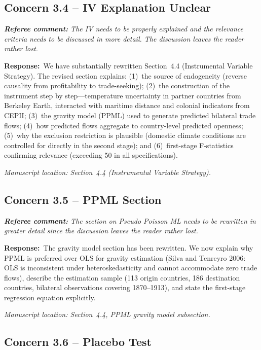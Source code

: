 \documentclass[11pt]{article}
\newcommand{\RC}[1]{\begin{refereebox}\textit{\textbf{Referee comment:} #1}\end{refereebox}}
\newcommand{\AR}{\noindent\textbf{Response:}\ }
\begin{document}
\subsection*{Concern 3.4 -- IV Explanation Unclear}

\RC{The IV needs to be properly explained and the relevance criteria needs to be discussed in more detail. The discussion leaves the reader rather lost.}

\AR We have substantially rewritten Section~4.4 (Instrumental Variable Strategy). The revised section explains: (1)~the source of endogeneity (reverse causality from profitability to trade-seeking); (2)~the construction of the instrument step by step---temperature uncertainty in partner countries from Berkeley Earth, interacted with maritime distance and colonial indicators from CEPII; (3)~the gravity model (PPML) used to generate predicted bilateral trade flows; (4)~how predicted flows aggregate to country-level predicted openness; (5)~why the exclusion restriction is plausible (domestic climate conditions are controlled for directly in the second stage); and (6)~first-stage F-statistics confirming relevance (exceeding 50 in all specifications).

\smallskip\noindent\textit{Manuscript location: Section~4.4 (Instrumental Variable Strategy).}

\subsection*{Concern 3.5 -- PPML Section}

\RC{The section on Pseudo Poisson ML needs to be rewritten in greater detail since the discussion leaves the reader rather lost.}

\AR The gravity model section has been rewritten. We now explain why PPML is preferred over OLS for gravity estimation (Silva and Tenreyro 2006: OLS is inconsistent under heteroskedasticity and cannot accommodate zero trade flows), describe the estimation sample (113 origin countries, 186 destination countries, bilateral observations covering 1870--1913), and state the first-stage regression equation explicitly.

\smallskip\noindent\textit{Manuscript location: Section~4.4, PPML gravity model subsection.}

\subsection*{Concern 3.6 -- Placebo Test}
\end{document}
